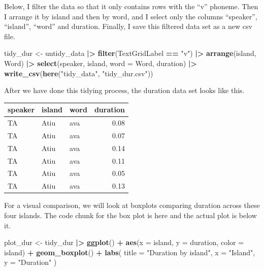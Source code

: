 \documentclass[
  ,man,floatsintext]{apa6}
\newenvironment{Shaded}{\begin{snugshade}}{\end{snugshade}}
\newcommand{\AttributeTok}[1]{\textcolor[rgb]{0.13,0.29,0.53}{#1}}
\newcommand{\FunctionTok}[1]{\textcolor[rgb]{0.13,0.29,0.53}{\textbf{#1}}}
\newcommand{\NormalTok}[1]{#1}
\newcommand{\OtherTok}[1]{\textcolor[rgb]{0.56,0.35,0.01}{#1}}
\newcommand{\SpecialCharTok}[1]{\textcolor[rgb]{0.81,0.36,0.00}{\textbf{#1}}}
\newcommand{\StringTok}[1]{\textcolor[rgb]{0.31,0.60,0.02}{#1}}
\begin{document}
Below, I filter the data so that it only contains rows with the ``v'' phoneme. Then I arrange it by island and then by word, and I select only the columns ``speaker'', ``island'', ``word'' and duration. Finally, I save this filtered data set as a new csv file.

\begin{Shaded}
\begin{Highlighting}[]
\NormalTok{tidy\_dur }\OtherTok{\textless{}{-}}\NormalTok{ untidy\_data }\SpecialCharTok{|\textgreater{}}
  \FunctionTok{filter}\NormalTok{(TextGridLabel }\SpecialCharTok{==} \StringTok{"v"}\NormalTok{) }\SpecialCharTok{|\textgreater{}}  
  \FunctionTok{arrange}\NormalTok{(island, Word) }\SpecialCharTok{|\textgreater{}}  
  \FunctionTok{select}\NormalTok{(speaker, island, }\AttributeTok{word =}\NormalTok{ Word, duration) }\SpecialCharTok{|\textgreater{}}
  \FunctionTok{write\_csv}\NormalTok{(}\FunctionTok{here}\NormalTok{(}\StringTok{"tidy\_data"}\NormalTok{, }\StringTok{"tidy\_dur.csv"}\NormalTok{))}
\end{Highlighting}
\end{Shaded}

After we have done this tidying process, the duration data set looks like this.

\begin{tabular}{l|l|l|r}
\hline
speaker & island & word & duration\\
\hline
TA & Atiu & ava & 0.08\\
\hline
TA & Atiu & ava & 0.07\\
\hline
TA & Atiu & ava & 0.14\\
\hline
TA & Atiu & ava & 0.11\\
\hline
TA & Atiu & ava & 0.05\\
\hline
TA & Atiu & ava & 0.13\\
\hline
\end{tabular}

For a visual comparison, we will look at boxplots comparing duration across these four islands. The code chunk for the box plot is here and the actual plot is below it.

\begin{Shaded}
\begin{Highlighting}[]
\NormalTok{plot\_dur }\OtherTok{\textless{}{-}}\NormalTok{ tidy\_dur }\SpecialCharTok{|\textgreater{}}
  \FunctionTok{ggplot}\NormalTok{() }\SpecialCharTok{+}
  \FunctionTok{aes}\NormalTok{(}\AttributeTok{x =}\NormalTok{ island, }\AttributeTok{y =}\NormalTok{ duration, }\AttributeTok{color =}\NormalTok{ island) }\SpecialCharTok{+}
  \FunctionTok{geom\_boxplot}\NormalTok{() }\SpecialCharTok{+}
  \FunctionTok{labs}\NormalTok{(}
    \AttributeTok{title =} \StringTok{"Duration by island"}\NormalTok{,}
    \AttributeTok{x =} \StringTok{"Island"}\NormalTok{,}
    \AttributeTok{y =} \StringTok{"Duration"}
\NormalTok{  )}
\end{Highlighting}
\end{Shaded}
\end{document}
